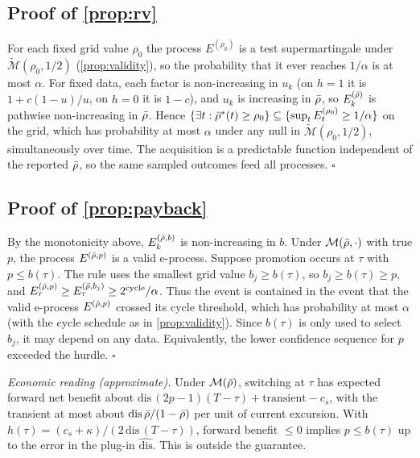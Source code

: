 \subsection{Proof of \cref{prop:rv}}
For each fixed grid value $\rho_0$ the process $E^{(\rho_0)}$ is a test supermartingale under
$\widetilde{\mathcal M}(\rho_0,1/2)$ (\cref{prop:validity}), so the probability that it ever reaches
$1/\alpha$ is at most $\alpha$. For fixed data, each factor is non-increasing in $u_k$ (on $h=1$ it is
$1+c(1-u)/u$, on $h=0$ it is $1-c$), and $u_k$ is increasing in $\bar\rho$, so $E^{(\bar\rho)}_k$ is
pathwise non-increasing in $\bar\rho$. Hence $\{\exists t:\bar\rho^*(t)\ge\rho_0\}\subseteq\{\sup_tE^{(\rho_0)}_t\ge1/\alpha\}$
on the grid, which has probability at most $\alpha$ under any null in
$\widetilde{\mathcal M}(\rho_0,1/2)$, simultaneously over time. The acquisition is a predictable
function independent of the reported $\bar\rho$, so the same sampled outcomes feed all processes. $\square$

\subsection{Proof of \cref{prop:payback}}
By the monotonicity above, $E^{(\bar\rho,b)}_k$ is non-increasing in $b$. Under $\mathcal M(\bar\rho,\cdot)$
with true $p$, the process $E^{(\bar\rho,p)}$ is a valid e-process. Suppose promotion occurs at $\tau$ with
$p\le b(\tau)$. The rule uses the smallest grid value $b_j\ge b(\tau)$, so $b_j\ge b(\tau)\ge p$, and
$E^{(\bar\rho,p)}_\tau\ge E^{(\bar\rho,b_j)}_\tau\ge2^{\rm cycle}/\alpha$. Thus the event is contained in
the event that the valid e-process $E^{(\bar\rho,p)}$ crossed its cycle threshold, which has probability
at most $\alpha$ (with the cycle schedule as in \cref{prop:validity}). Since $b(\tau)$ is only used to
select $b_j$, it may depend on any data. Equivalently, the lower confidence sequence for $p$ exceeded
the hurdle. $\square$

\emph{Economic reading (approximate).} Under $\mathcal M(\bar\rho)$, switching at $\tau$ has expected forward
net benefit about $\mathrm{dis}\,(2p-1)(T-\tau)+\text{transient}-c_s$, with the transient at most about
$\mathrm{dis}\,\bar\rho/(1-\bar\rho)$ per unit of current excursion. With
$h(\tau)=(c_s+\kappa)/(2\,\mathrm{dis}\,(T-\tau))$, forward benefit $\le0$ implies $p\le b(\tau)$ up to
the error in the plug-in $\widehat{\mathrm{dis}}$. This is outside the guarantee.
